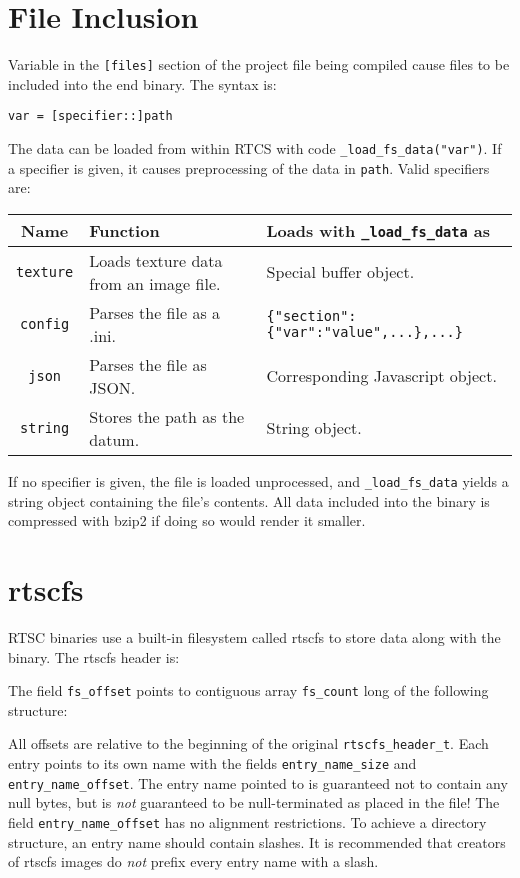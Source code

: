 \documentclass[10pt]{book}
\begin{document}
\section{File Inclusion}
\label{section_files}
Variable in the \texttt{[files]} section of the project file being compiled cause files to be included into the end binary.
The syntax is:
\begin{center}
\texttt{var = [specifier::]path}
\end{center}
The data can be loaded from within RTCS with code \texttt{\_load\_fs\_data("var")}.
If a specifier is given, it causes preprocessing of the data in \texttt{path}.
Valid specifiers are:
\begin{center}
\begin{tabular}{c | l | l}
	Name & Function & Loads with \texttt{\_load\_fs\_data} as \\\hline
	\texttt{texture} & Loads texture data from an image file. & Special buffer object. \\
	\texttt{config} & Parses the file as a .ini. & \texttt{\{"section":\{"var":"value",...\},...\}} \\
	\texttt{json} & Parses the file as JSON. & Corresponding Javascript object. \\
	\texttt{string} & Stores the path as the datum. & String object. \\
\end{tabular}
\end{center}
If no specifier is given, the file is loaded unprocessed, and \texttt{\_load\_fs\_data} yields a string object containing the file's contents.
All data included into the binary is compressed with bzip2 if doing so would render it smaller.

\section{rtscfs}
\label{section_rtscfs}
RTSC binaries use a built-in filesystem called rtscfs to store data along with the binary.
The rtscfs header is:

The field \texttt{fs\_offset} points to contiguous array \texttt{fs\_count} long of the following structure:

All offsets are relative to the beginning of the original \texttt{rtscfs\_header\_t}.
Each entry points to its own name with the fields \texttt{entry\_name\_size} and \texttt{entry\_name\_offset}.
The entry name pointed to is guaranteed not to contain any null bytes, but is \emph{not} guaranteed to be null-terminated as placed in the file!
The field \texttt{entry\_name\_offset} has no alignment restrictions.
To achieve a directory structure, an entry name should contain slashes.
It is recommended that creators of rtscfs images do \emph{not} prefix every entry name with a slash.
\end{document}
